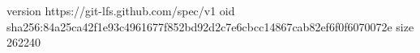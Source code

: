 version https://git-lfs.github.com/spec/v1
oid sha256:84a25ca42f1e93c4961677f852bd92d2c7e6cbcc14867cab82ef6f0f6070072e
size 262240
